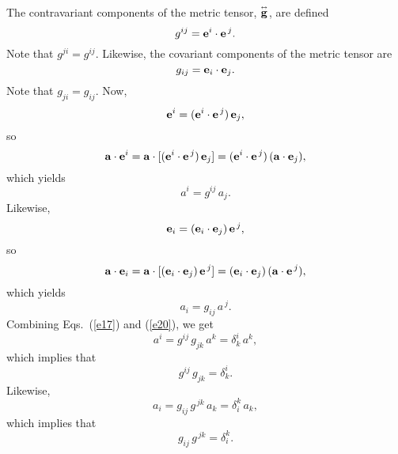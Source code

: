 \documentclass[12pt,prb,aps,notitlepage]{revtex4-1}
\newcommand{\smalltensor}[1]{\overset{\text{\tiny$\leftrightarrow$}}{#1}}
\begin{document}
 The contravariant components of the metric tensor, $\smalltensor{\bf g}$, are defined
 \begin{equation}
 g^{ij} = {\bf e}^i\cdot{\bf e}^{\,j}.
 \end{equation}
 Note that $g^{ji}=g^{ij}$. 
 Likewise, the covariant components of the metric tensor are  
 \begin{equation}
 g_{ij} = {\bf e}_i\cdot{\bf e}_j.
 \end{equation}
 Note that $g_{ji}= g_{ij}$. 
 Now, 
 \begin{equation}
 {\bf e}^i = ({\bf e}^i\cdot{\bf e}^{\,j})\,{\bf e}_j,
 \end{equation}
so
\begin{equation}
{\bf a}\cdot{\bf e}^i = {\bf a}\cdot[ ({\bf e}^i\cdot{\bf e}^{\,j})\,{\bf e}_j]=( {\bf e}^i\cdot{\bf e}^{\,j})\,({\bf a}\cdot{\bf e}_j),
\end{equation}
which yields
\begin{equation}\label{e17}
a^i = g^{ij}\,a_j.
\end{equation}
Likewise, 
\begin{equation}
 {\bf e}_i = ({\bf e}_i\cdot{\bf e}_j)\,{\bf e}^{\,j},
 \end{equation}
so 
\begin{equation}
{\bf a}\cdot{\bf e}_i = {\bf a}\cdot[ ({\bf e}_i\cdot{\bf e}_j)\,{\bf e}^{\,j}]= ({\bf e}_i\cdot{\bf e}_j)\,({\bf a}\cdot{\bf e}^{\,j}),
\end{equation}
which yields
\begin{equation}\label{e20}
a_i = g_{ij}\,a^{\,j}.
\end{equation}
Combining Eqs.~(\ref{e17}) and (\ref{e20}), we get
\begin{equation}
a^i = g^{ij}\,g_{jk}\,a^k = \delta^{i}_k\,a^k,
\end{equation}
which implies that
\begin{equation}
g^{ij}\,g_{jk}= \delta^{i}_k.
\end{equation}
Likewise, 
\begin{equation}
a_i = g_{ij}\,g^{\,jk}\,a_k = \delta_{i}^k\,a_k,
\end{equation}
which implies that
\begin{equation}
g_{ij}\,g^{\,jk}= \delta_{i}^k.
\end{equation}
\end{document}
